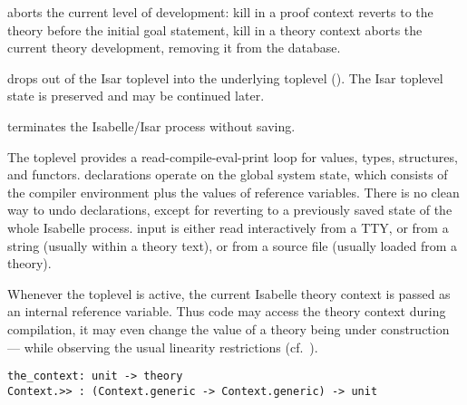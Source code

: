 \begin{isabellebody}
\begin{isamarkuptext}
\begin{description}
  \item {} aborts the current level of development:
  kill in a proof context reverts to the theory before the initial
  goal statement, kill in a theory context aborts the current theory
  development, removing it from the database.

  \item {} drops out of the Isar toplevel into the
  underlying {\ML} toplevel ().  The Isar
  toplevel state is preserved and may be continued later.

  \item {} terminates the Isabelle/Isar process without
  saving.

  \end{description}%
\end{isamarkuptext}%
\isamarkuptrue%
%
\isamarkuptrue%
%
\begin{isamarkuptext}%
The {\ML} toplevel provides a read-compile-eval-print loop for {\ML}
  values, types, structures, and functors.  {\ML} declarations operate
  on the global system state, which consists of the compiler
  environment plus the values of {\ML} reference variables.  There is
  no clean way to undo {\ML} declarations, except for reverting to a
  previously saved state of the whole Isabelle process.  {\ML} input
  is either read interactively from a TTY, or from a string (usually
  within a theory text), or from a source file (usually loaded from a
  theory).

  Whenever the {\ML} toplevel is active, the current Isabelle theory
  context is passed as an internal reference variable.  Thus {\ML}
  code may access the theory context during compilation, it may even
  change the value of a theory being under construction --- while
  observing the usual linearity restrictions
  (cf.~).%
\end{isamarkuptext}%
\isamarkuptrue%
%
\isadelimmlref
%
\endisadelimmlref
%
\isatagmlref
%
\begin{isamarkuptext}%
\begin{mldecls}
  \verb|the_context: unit -> theory| \\
  \verb|Context.>> : (Context.generic -> Context.generic) -> unit| \\
  \end{mldecls}

  \begin{description}


\end{description}
\end{isamarkuptext}
\end{isabellebody}
